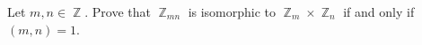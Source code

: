 \documentclass{article}
\DeclareMathOperator{\Z}{\mathbb{Z}}
\begin{document}
Let \(m,n\in\Z\). Prove that \(\Z_{mn}\) is isomorphic to \(\Z_m\times\Z_n\) if and only if \((m,n)=1\).
\end{document}
